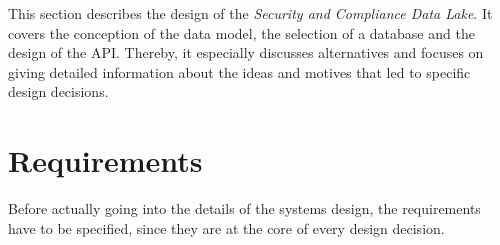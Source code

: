 
This section describes the design of the \textit{Security and Compliance Data Lake}. It covers the conception of the data model, the selection of a database and the design of the API. Thereby, it especially discusses alternatives and focuses on giving detailed information about the ideas and motives that led to specific design decisions.

\section{Requirements} \label{sec:Requirements}
Before actually going into the details of the systems design, the requirements have to be specified, since they are at the core of every design decision.  

